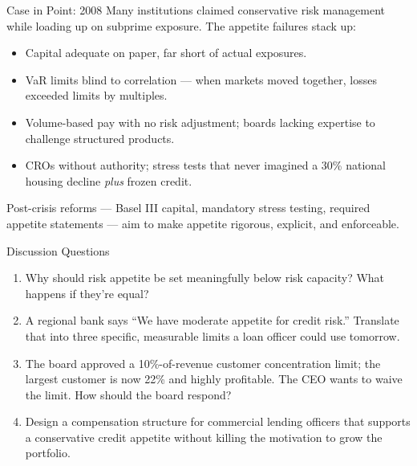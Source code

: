 \documentclass[11pt, aspectratio=169]{beamer}
\begin{document}
\begin{frame}{Case in Point: 2008}
Many institutions claimed conservative risk management while loading up on subprime exposure. The appetite failures stack up:
\begin{itemize}
  \item Capital adequate on paper, far short of actual exposures.
  \item VaR limits blind to correlation --- when markets moved together, losses exceeded limits by multiples.
  \item Volume-based pay with no risk adjustment; boards lacking expertise to challenge structured products.
  \item CROs without authority; stress tests that never imagined a 30\% national housing decline \emph{plus} frozen credit.
\end{itemize}
\medskip
Post-crisis reforms --- Basel III capital, mandatory stress testing, required appetite statements --- aim to make appetite rigorous, explicit, and enforceable.
\end{frame}

\begin{frame}{Discussion Questions}
\begin{enumerate}
  \item Why should risk appetite be set meaningfully below risk capacity? What happens if they're equal?
  \item A regional bank says ``We have moderate appetite for credit risk.'' Translate that into three specific, measurable limits a loan officer could use tomorrow.
  \item The board approved a 10\%-of-revenue customer concentration limit; the largest customer is now 22\% and highly profitable. The CEO wants to waive the limit. How should the board respond?
  \item Design a compensation structure for commercial lending officers that supports a conservative credit appetite without killing the motivation to grow the portfolio.
\end{enumerate}
\end{frame}
\end{document}
